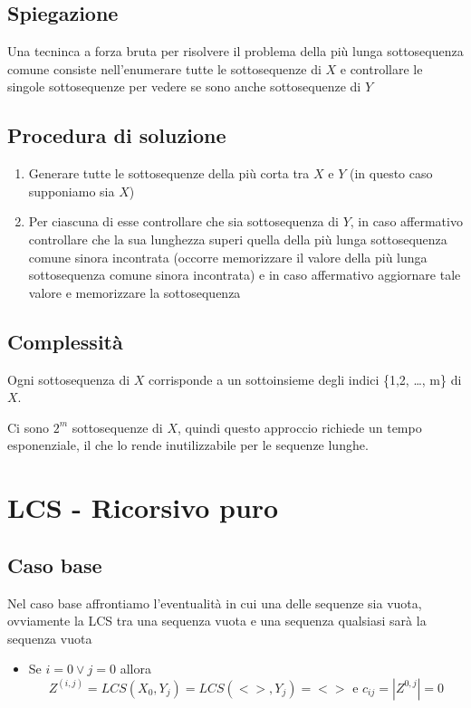 \subsection{Spiegazione}
Una tecninca a forza bruta per risolvere il problema della più lunga sottosequenza comune consiste nell'enumerare tutte le sottosequenze di $X$ e controllare le singole sottosequenze per vedere se sono anche sottosequenze di $Y$

\subsection{Procedura di soluzione}
\begin{enumerate}
    \item Generare tutte le sottosequenze della più corta tra $X$ e $Y$ (in questo caso supponiamo sia $X$)
    \item Per ciascuna di esse controllare che sia sottosequenza di $Y$, in caso affermativo controllare che la sua lunghezza superi quella della più lunga sottosequenza comune sinora incontrata (occorre memorizzare il valore della più lunga sottosequenza comune sinora incontrata) e in caso affermativo aggiornare tale valore e memorizzare la sottosequenza
\end{enumerate}

\subsection{Complessità}
Ogni sottosequenza di $X$ corrisponde a un sottoinsieme degli indici \{1,2, \dots, m\} di $X$.

Ci sono $2^m$ sottosequenze di $X$, quindi questo approccio richiede un tempo esponenziale, il che lo rende inutilizzabile per le sequenze lunghe.

\newpage
\section{LCS - Ricorsivo puro}

\subsection{Caso base}
Nel caso base affrontiamo l'eventualità in cui una delle sequenze sia vuota, ovviamente la LCS tra una sequenza vuota e una sequenza qualsiasi sarà la sequenza vuota


\begin{itemize}
    \item Se $i=0 \lor j=0$ allora 
        $$Z^{(i,j)}=LCS(X_0,Y_j) = LCS(<>,Y_j)=<> \text{ e }  c_{ij}=|Z^{0,j}|=0$$
\end{itemize}

